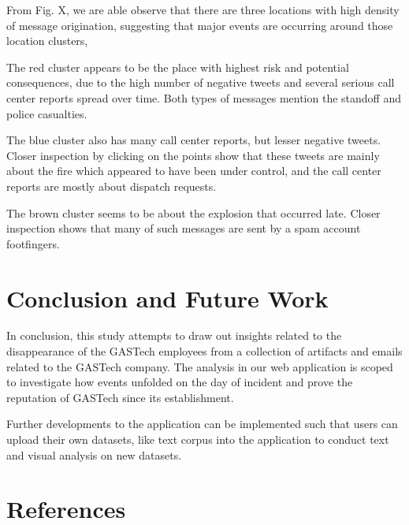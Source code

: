 \documentclass{acm_proc_article-sp}
\begin{document}
From Fig. X, we are able observe that there are three locations with
high density of message origination, suggesting that major events are
occurring around those location clusters,

The red cluster appears to be the place with highest risk and potential
consequences, due to the high number of negative tweets and several
serious call center reports spread over time. Both types of messages
mention the standoff and police casualties.

The blue cluster also has many call center reports, but lesser negative
tweets. Closer inspection by clicking on the points show that these
tweets are mainly about the fire which appeared to have been under
control, and the call center reports are mostly about dispatch requests.

The brown cluster seems to be about the explosion that occurred late.
Closer inspection shows that many of such messages are sent by a spam
account footfingers.

\hypertarget{conclusion-and-future-work}{%
\section{Conclusion and Future Work}\label{conclusion-and-future-work}}

In conclusion, this study attempts to draw out insights related to the
disappearance of the GASTech employees from a collection of artifacts
and emails related to the GASTech company. The analysis in our web
application is scoped to investigate how events unfolded on the day of
incident and prove the reputation of GASTech since its establishment.

Further developments to the application can be implemented such that
users can upload their own datasets, like text corpus into the
application to conduct text and visual analysis on new datasets.

\hypertarget{references}{%
\section{References}\label{references}}
\setlength{\parindent}{0in}
\end{document}

